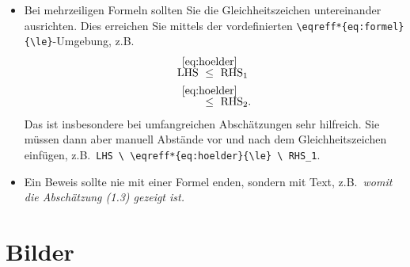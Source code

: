 \begin{itemize}
  \item Bei mehrzeiligen Formeln sollten Sie die Gleichheitszeichen untereinander ausrichten. Dies erreichen Sie mittels der vordefinierten \verb$\eqreff*{eq:formel}{\le}$-Umgebung, z.B.
        \begin{align*}
          \textup{LHS} \  & \eqreff*{eq:hoelder}{\le} \ \textup{RHS}_1  \\
                          & \eqreff*{eq:hoelder}{\le} \ \textup{RHS}_2.
        \end{align*}
        Das ist insbesondere bei umfangreichen Abschätzungen sehr hilfreich. Sie müssen dann aber
        manuell Abstände vor und nach dem Gleichheitszeichen einfügen, z.B.\ \verb$LHS \ \eqreff*{eq:hoelder}{\le} \ RHS_1$.

  \item Ein Beweis sollte nie mit einer Formel enden, sondern mit Text, z.B.\ \emph{womit die Abschätzung {\normalfont(1.3)} gezeigt ist.}
\end{itemize}

\section{Bilder}

